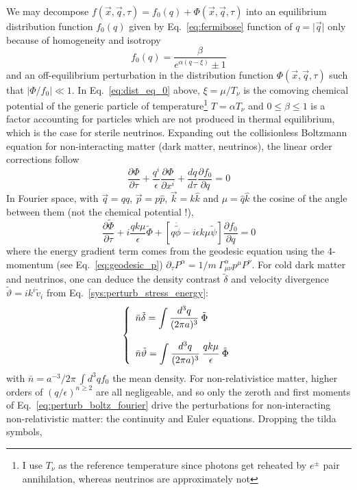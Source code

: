 We may decompose $f(\vec{x}, \vec{q}, \tau) = f_0(q) + \Phi(\vec{x}, \vec{q}, \tau)$ into an equilibrium distribution function $f_0 (q)$ given by Eq.~\ref{eq:fermibose} function of $q = \vert \vec{q} \vert$ only because of homogeneity and isotropy
\begin{equation}
\label{eq:dist_eq_0}
f_0(q) = \frac{\beta}{e^{\alpha (q-\xi)} \pm 1}
\end{equation} and an off-equilibrium perturbation in the distribution function $\Phi(\vec{x}, \vec{q}, \tau)$ such that $\vert \Phi/f_0 \vert \ll 1$. In Eq.~\ref{eq:dist_eq_0} above, $\xi = \mu / T_\nu$ is the comoving chemical potential of the generic particle of temperature\footnote{I use $T_\nu$ as the reference temperature since photons get reheated by $e^{\pm}$ pair annihilation, whereas neutrinos are approximately not} $T = \alpha T_\nu$ and $0 \leqslant \beta \leqslant 1$ is a factor accounting for particles which are not produced in thermal equilibrium, which is the case for sterile neutrinos. Expanding out the collisionless Boltzmann equation for non-interacting matter (dark matter, neutrinos), the linear order corrections follow
\begin{equation}
\label{eq:perturb_boltz}
\frac{\partial \Phi}{\partial \tau} + \frac{q^i}{\epsilon}\frac{\partial \Phi}{\partial x^i} + \frac{d q}{d \tau} \frac{\partial f_0}{\partial q} = 0
\end{equation} In Fourier space, with $\vec{q} = q \hat{q}$, $\vec{p} = p \hat{p}$, $\vec{k} = k \hat{k}$ and $\mu = \hat{q} \hat{k}$ the cosine of the angle between them (not the chemical potential !), 
\begin{equation}
\label{eq:perturb_boltz_fourier}
\frac{\partial \tilde{\Phi}}{\partial \tau} + i \frac{qk\mu}{\epsilon} \tilde{\Phi} + \left[ q \dot{\tilde{\phi}} - i \epsilon k \mu \tilde{\psi} \right] \frac{\partial f_0}{\partial q} = 0
\end{equation} where the energy gradient term comes from the geodesic equation using the 4-momentum (see Eq.~\ref{eq:geodesic_p}) $\partial_\tau P^\alpha = 1/m~ \Gamma^\alpha_{\mu \nu} p^\mu P^\nu$. For cold dark matter and neutrinos, one can deduce the density contrast $\tilde{\delta}$ and velocity divergence $\tilde{\vartheta} = i k^i \tilde{v}_i$ from Eq.~\ref{sys:perturb_stress_energy}:
\begin{equation}
\label{eq:boltmo}
\left\{
\begin{array}{l}
\bar{n} \tilde{\delta} = \displaystyle \int \cfrac{d^3 q}{(2 \pi a)^3} ~\tilde{\Phi}\\
\\
\bar{n} \tilde{\vartheta} = \displaystyle \int \cfrac{d^3 q}{(2 \pi a)^3} ~ \cfrac{qk\mu}{\epsilon} ~\tilde{\Phi}
\end{array}
\right.
\end{equation} with $\bar{n} = a^{-3}/2\pi~ \displaystyle\int d^3 q f_0$ the mean density. For non-relativistice matter, higher orders of $(q/\epsilon)^{n \geqslant 2}$ are all negligeable, and so only the zeroth and first moments of Eq.~\ref{eq:perturb_boltz_fourier} drive the perturbations for non-interacting non-relativistic matter: the continuity and Euler equations. Dropping the tilda symbols,  \\
